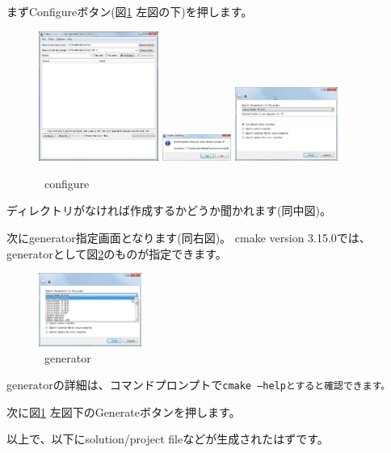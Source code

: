 \begin{narrow}[15pt]
	まずConfigureボタン(図\ref{fig:CmakeConfigure} 左図の下)を押します。
	\begin{figure}[h]
	\begin{center}
	\includegraphics[width=0.35\textwidth]{fig/CmakeConfigure1.eps}
	\includegraphics[width=0.2\textwidth]{fig/CmakeConfigure2.eps}
	\includegraphics[width=0.3\textwidth]{fig/CmakeConfigure3.eps}
	\end{center}
	\caption{\cmake\ configure}
	\label{fig:CmakeConfigure}
	\end{figure}

	\build ディレクトリがなければ作成するかどうか聞かれます(同中図)。

	次にgenerator指定画面となります(同右図)。
	cmake version 3.15.0では、
	generatorとして図\ref{fig:CmakeGenerator}のものが指定できます。
	\begin{figure}[h]
	\begin{center}
	\includegraphics[width=0.3\textwidth]{fig/CmakeConfigure4.eps}
	\end{center}
	\caption{\cmake\ generator}
	\label{fig:CmakeGenerator}
	\end{figure}

	\medskip
	generatorの詳細は、コマンドプロンプトで\tt{cmake --help}とすると確認できます。

	次に図\ref{fig:CmakeConfigure} 左図下のGenerateボタンを押します。
\end{narrow}

\medskip
\noindent
以上で、\build 以下にsolution/project fileなどが生成されたはずです。

